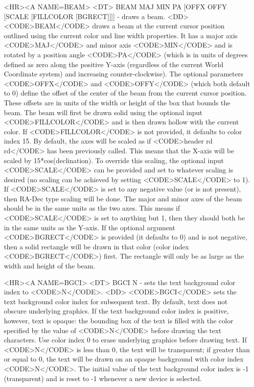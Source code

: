 \begin{rawhtml}
<HR><A NAME=BEAM>
<DT>
BEAM MAJ MIN PA [OFFX OFFY [SCALE [FILLCOLOR [BGRECT]]]] - draws a beam.
<DD>
	<CODE>BEAM</CODE> draws a beam at the current cursor position
	outlined using the current color and line width properties.
	It has a major axis <CODE>MAJ</CODE> and minor axis
	<CODE>MIN</CODE> and is rotated by a position angle <CODE>PA</CODE>
	(which is in units of degrees defined as zero along the positive
	Y-axis (regardless of the current World Coordinate system) and
	increasing counter-clockwise).  The optional parameters
	<CODE>OFFX</CODE> and <CODE>OFFY</CODE> (which both default to 0)
	define the offset of the center of the beam from the current
	cursor position.  These offsets are in units of the width or
	height of the box that bounds the beam.  The beam will first be
	drawn solid using the optional input <CODE>FILLCOLOR</CODE> and is
	then drawn hollow with the current color.  If <CODE>FILLCOLOR</CODE>
	is not provided, it defaults to color index 15.
	By default, the axes will be scaled as if <CODE>header rd rd</CODE>
	has been previously called.  This means that the X-axis will be
	scaled by 15*cos(declination).  To override this scaling, the optional
	input <CODE>SCALE</CODE> can be provided and set to whatever
	scaling is desired (no scaling can be achieved by setting
	<CODE>SCALE</CODE> to 1).  If <CODE>SCALE</CODE> is set to any
	negative value (or is not present), then RA-Dec type scaling will be
	done.  The major and minor axes of the beam should be in the same
	units as the two axes.  This means if <CODE>SCALE</CODE> is set
	to anything but 1, then they should both be in the same units
	as the Y-axis.
	If the optional argument <CODE>BGRECT</CODE> is provided
	(it defaults to 0) and is not negative, then a solid rectangle
	will be drawn in that color (color index <CODE>BGRECT</CODE>) first.
	The rectangle will only be as large as the width and height of the beam.

<HR><A NAME=BGCI>
<DT>
BGCI N - sets the text background color index to <CODE>N</CODE>.
<DD>
	<CODE>BGCI</CODE> sets the text background color index for
	subsequent text.  By default, text does not obscure underlying
	graphics.  If the text background color index is positive,
	however, text is opaque:  the bounding box of the text is
	filled with the color specified by the value of <CODE>N</CODE>
	before drawing the text characters.  Use color index 0 to erase
	underlying graphics before drawing text.  If <CODE>N</CODE> is
	less than 0, the text will be transparent; if greater than or
	equal to 0, the text will be drawn on an opaque background with
	color index <CODE>N</CODE>.  The initial value of the text
	background color index is -1 (transparent) and is reset to -1
	whenever a new device is selected.


\end{rawhtml}
